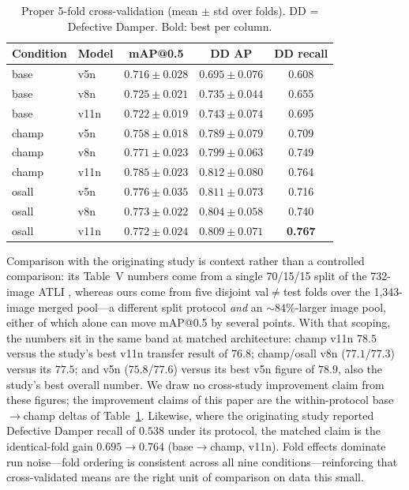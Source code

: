 \documentclass[conference]{IEEEtran}
\makeatletter
\newcommand{\dd}{Defective Damper}
\newcommand{\map}{mAP@0.5}
\makeatother
\begin{document}
\begin{table}[t]
\caption{Proper 5-fold cross-validation (mean $\pm$ std over folds). DD = \dd{}. Bold: best per column.}
\label{tab:cv}
\centering
\footnotesize
\begin{tabular}{llccc}
\toprule
Condition & Model & \map{} & DD AP & DD recall \\
\midrule
base  & v5n  & $0.716\pm0.028$ & $0.695\pm0.076$ & 0.608 \\
base  & v8n  & $0.725\pm0.021$ & $0.735\pm0.044$ & 0.655 \\
base  & v11n & $0.722\pm0.019$ & $0.743\pm0.074$ & 0.695 \\
\midrule
champ & v5n  & $0.758\pm0.018$ & $0.789\pm0.079$ & 0.709 \\
champ & v8n  & $0.771\pm0.023$ & $0.799\pm0.063$ & 0.749 \\
champ & v11n & $\mathbf{0.785\pm0.023}$ & $\mathbf{0.812\pm0.080}$ & 0.764 \\
\midrule
osall & v5n  & $0.776\pm0.035$ & $0.811\pm0.073$ & 0.716 \\
osall & v8n  & $0.773\pm0.022$ & $0.804\pm0.058$ & 0.740 \\
osall & v11n & $0.772\pm0.024$ & $0.809\pm0.071$ & \textbf{0.767} \\
\bottomrule
\end{tabular}
\end{table}

Comparison with the originating study is context rather than a controlled comparison: its Table~V numbers come from a single 70/15/15 split of the 732-image ATLI \cite{tsai2025atli}, whereas ours come from five disjoint val${}\neq{}$test folds over the 1{,}343-image merged pool---a different split protocol \emph{and} an ${\sim}84\%$-larger image pool, either of which alone can move \map{} by several points. With that scoping, the numbers sit in the same band at matched architecture: champ v11n $78.5$ versus the study's best v11n transfer result of $76.8$; champ/osall v8n ($77.1$/$77.3$) versus its $77.5$; and v5n ($75.8$/$77.6$) versus its best v5n figure of $78.9$, also the study's best overall number. We draw no cross-study improvement claim from these figures; the improvement claims of this paper are the within-protocol base${\to}$champ deltas of Table~\ref{tab:cv}. Likewise, where the originating study reported \dd{} recall of $0.538$ under its protocol, the matched claim is the identical-fold gain $0.695{\to}0.764$ (base${\to}$champ, v11n). Fold effects dominate run noise---fold ordering is consistent across all nine conditions---reinforcing that cross-validated means are the right unit of comparison on data this small.
\end{document}
